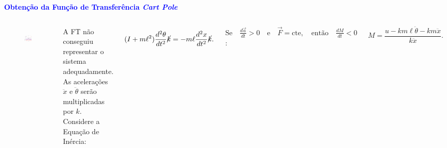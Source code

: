 \documentclass[aspectratio=169]{beamer}
\begin{document}
\begin{frame}{\textcolor{blue}{\textbf{Obtenção da Função de Transferência \textit{Cart Pole}}}}
\begin{columns}
\vspace{-.55cm}
\begin{figure}[H]
     \centering
     \includegraphics[scale=.45]{images/entval.png}
     \label{fig:entval}
\end{figure}

\justifying A FT não conseguiu representar o sistema adequadamente.
\justifying As acelerações $\ddot{x}$ e $\ddot{\theta}$ serão multiplicadas por $k$. Considere a Equação de Inércia:

\begin{equation}
    (I + m\ell^2)\frac{d^2\theta}{dt^2}\cancel{k}   = - m\ell\frac{d^2x}{dt^2} \cancel{k}.
    \label{eq:inercia}
\end{equation}

\noindent \justifying $\text{Se} \quad \frac{d\vec{a}}{dt} > 0 \quad \text{e} \quad \vec{F} = \text{cte}, \quad \text{então} \quad \frac{dM}{dt} < 0$:

\begin{equation}
    M = \frac{u - km\ell\ddot{\theta}-km\ddot{x}}{k\ddot{x}}.
    \label{eq:Ma}
\end{equation}
\vspace*{.85cm}
\end{columns}
\end{frame}

\end{document}
